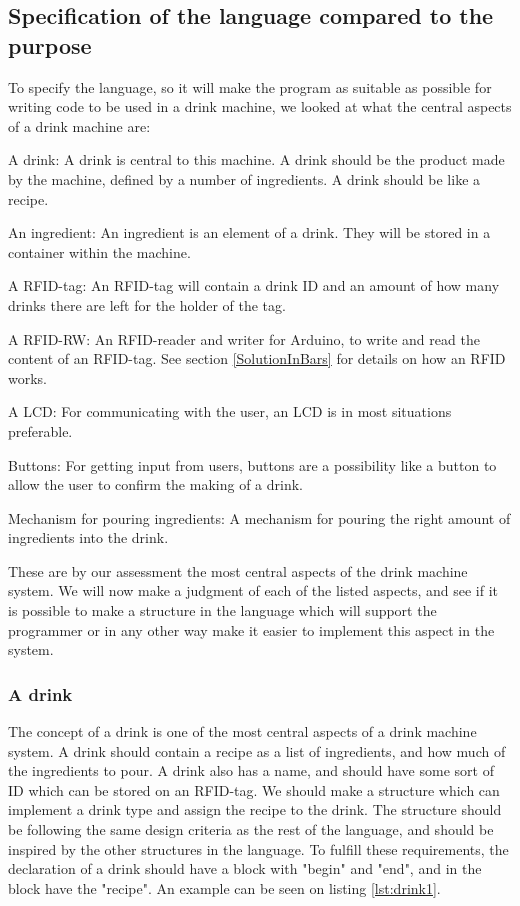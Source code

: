 \subsection{Specification of the language compared to the purpose}
\label{sec:specific}
To specify the language, so it will make the program as suitable as possible for writing code to be used in a drink machine, we looked at what the central aspects of a drink machine are:
\begin{inddes}
\item[A drink:] A drink is central to this machine. A drink should be the product made by the machine, defined by a number of ingredients. A drink should be like a recipe.
\item[An ingredient:] An ingredient is an element of a drink. They will be stored in a container within the machine. 
\item[A RFID-tag:] An RFID-tag will contain a drink ID and an amount of how many drinks there are left for the holder of the tag.
\item[A RFID-RW:] An RFID-reader and writer for Arduino, to write and read the content of an RFID-tag. See section \ref{SolutionInBars} for details on how an RFID works.
\item[A LCD:] For communicating with the user, an LCD is in most situations preferable.
\item[Buttons:] For getting input from users, buttons are a possibility like a button to allow the user to confirm the making of a drink. 
\item[Mechanism for pouring ingredients:] A mechanism for pouring the right amount of ingredients into the drink.
\end{inddes}
These are by our assessment the most central aspects of the drink machine system. We will now make a judgment of each of the listed aspects, and see if it is possible to make a structure in the language which will support the programmer or in any other way make it easier to implement this aspect in the system.
\subsubsection{A drink}
The concept of a drink is one of the most central aspects of a drink machine system. A drink should contain a recipe as a list of ingredients, and how much of the ingredients to pour. A drink also has a name, and should have some sort of ID which can be stored on an RFID-tag. We should make a structure which can implement a drink type and assign the recipe to the drink. The structure should be following the same design criteria as the rest of the language, and should be inspired by the other structures in the language. To fulfill these requirements, the declaration of a drink should have a block with "begin" and "end", and in the block have the "recipe". An example can be seen on listing \ref{lst:drink1}.

